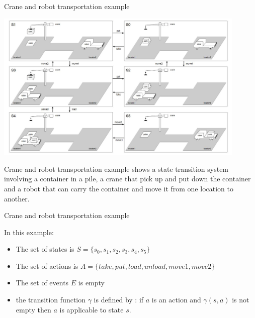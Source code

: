 \documentclass[9pt]{beamer}
\begin{document}
\begin{frame}{Crane and robot transportation example}
\begin{small}

\begin{center}
\includegraphics[keepaspectratio, width=0.90\textwidth]{images/automated_planning_example1.jpg}
\end{center}

\vspace{-4mm}

Crane and robot transportation example shows a state transition system involving a container in a pile, a crane that pick up and put down the container and a robot that can carry the container and move it from one location to another.
\end{small}
\end{frame}

\begin{frame}{Crane and robot transportation example}
\begin{small}

In this example:
\begin{itemize}
\item The set of states is $S=\{s_0, s_1, s_2, s_3, s_4, s_5\}$
\item The set of actions is $A=\{take, put, load, unload, move1, move2\}$
\item The set of events $E$ is empty
\item the transition function $\gamma$ is defined by : if $a$ is an action and $\gamma(s,a)$ is not empty then $a$ is applicable to state $s$.
\end{itemize}

\end{small}
\end{frame}
\end{document}
